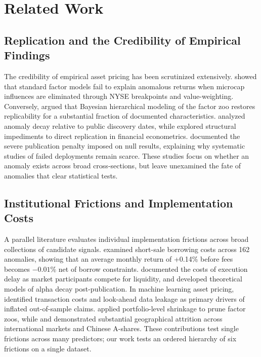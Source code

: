 \documentclass{ieeeaccess}
\begin{document}
\section{Related Work}
\label{sec:related_work}

\subsection{Replication and the Credibility of Empirical Findings}
The credibility of empirical asset pricing has been scrutinized extensively. \cite{hou2020replicating} showed that standard factor models fail to explain anomalous returns when microcap influences are eliminated through NYSE breakpoints and value-weighting. Conversely, \cite{jensen2023there} argued that Bayesian hierarchical modeling of the factor zoo restores replicability for a substantial fraction of documented characteristics. \cite{bowles2024anomaly} analyzed anomaly decay relative to public discovery dates, while \cite{chai2026understanding} explored structural impediments to direct replication in financial econometrics. \cite{chopra2023null} documented the severe publication penalty imposed on null results, explaining why systematic studies of failed deployments remain scarce. These studies focus on whether an anomaly exists across broad cross-sections, but leave unexamined the fate of anomalies that clear statistical tests.

\subsection{Institutional Frictions and Implementation Costs}
A parallel literature evaluates individual implementation frictions across broad collections of candidate signals. \cite{muravyev2025anomalies} examined short-sale borrowing costs across 162 anomalies, showing that an average monthly return of +0.14\% before fees becomes $-0.01$\% net of borrow constraints. \cite{kaplanski2023race} documented the costs of execution delay as market participants compete for liquidity, and \cite{penasse2022understanding} developed theoretical models of alpha decay post-publication. In machine learning asset pricing, \cite{bagnara2024asset} identified transaction costs and look-ahead data leakage as primary drivers of inflated out-of-sample claims. \cite{sak2024exploring} applied portfolio-level shrinkage to prune factor zoos, while \cite{azevedo2023stock} and \cite{li2024replicating} demonstrated substantial geographical attrition across international markets and Chinese A-shares. These contributions test single frictions across many predictors; our work tests an ordered hierarchy of six frictions on a single dataset.
\end{document}
